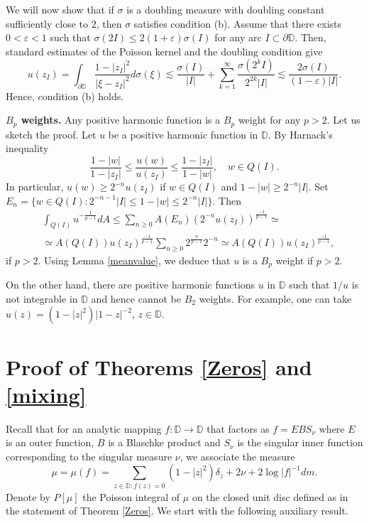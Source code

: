 \documentclass[a4paper,12pt]{article}
\theoremstyle{definition}
\numberwithin{equation}{section}
\newcommand{\D}{\mathbb D}
\begin{document}
\medskip

We will now show that if $\sigma$ is a doubling measure with doubling constant sufficiently close to $2$, then $\sigma$ satisfies condition (b). Assume that there exists $0< \varepsilon < 1$ such that $\sigma(2I) \leq 2 (1 + \varepsilon) \sigma (I)$ for any arc $I \subset \partial \D$. Then, standard estimates of the Poisson kernel and the doubling condition give
$$
u(z_I) =  \int_{\partial \mathbb{D}} \frac{1-\left|z_{I}\right|^{2}}{\left|\xi-z_{I}\right|^{2}} d \sigma(\xi) \lesssim \frac{\sigma (I)}{|I|} + \sum_{k=1}^\infty \frac{\sigma\left(2^{k} I \right)}{2^{2k}\left| I\right|} \lesssim \frac{2 \sigma (I) }{(1- \varepsilon) |I|}.  
$$
Hence, condition (b) holds. 

\textbf{$B_p$ weights.} Any positive harmonic function is a $B_{p}$ weight for any $p>2$. Let us sketch the proof. Let $u$ be a positive harmonic function in $\mathbb{D}$. By Harnack's inequality
$$
\frac{1-|w|}{1-|z_I|} \leq \frac{u(w)}{u(z_I)} \leq \frac{1-|z_I|}{1-|w|},  \quad w \in Q(I).
$$
In particular, $u(w) \geq 2^{-n} u(z_I)$ if $w \in Q(I)$ and $1-|w| \geq 2^{-n} |I|$. Set $E_n = \{ w \in Q(I): 2^{-n-1} |I| \leq 1-|w| \leq 2^{-n} |I| \}$. Then 
$$
\begin{aligned}
& \int_{Q(I)} u^{-\frac{1}{p-1}} d A \leqslant \sum_{n \geqslant 0} A(E_n) \left(2^{-n} u\left(z_{I}\right)\right)^{\frac{-1}{p-1}}  \simeq \\
& \simeq A(Q(I)) u\left(z_{I}\right)^{\frac{-1}{p-1}} \sum_{n \geqslant 0} 2^{\frac{n}{p-1}} 2^{-n} \simeq A(Q(I)) u\left(z_{I}\right)^{\frac{-1}{p-1}},  
\end{aligned}
$$
if $p>2$. Using Lemma \ref{meanvalue}, we deduce that $u$ is a $ B_{p}$ weight if $ p>2$.

On the other hand, there are positive harmonic functions $u$ in $\mathbb{D}$ such that $1 / u $ is not integrable in $\mathbb{D}$ and hence cannot be  $B_{2}$ weights. For example, one can take $u(z) = (1-|z|^2) |1 - z|^{-2}$, $ z \in \D$.


\section{Proof of Theorems \ref{Zeros} and \ref{mixing}}\label{section3}

Recall that for an analytic mapping $f: \D \rightarrow \D$ that factors as $f= E B  S_{\nu}$ where $E$ is an outer function, $B$ is a Blaschke product and $S_\nu$ is the singular inner function corresponding to the singular measure $\nu$, we associate the measure
\begin{equation}
\label{4radial}
\mu=\mu(f)=\sum_{z \in \D : f(z)=0}\left(1-|z|^{2}\right) \delta_{z}+2 \nu + 2 \log |f|^{-1} dm . 
\end{equation}
Denote by $P[\mu]$ the Poisson integral of $\mu$ on the closed unit disc defined as in the statement of Theorem \ref{Zeros}. We start with the following auxiliary result.
\end{document}
